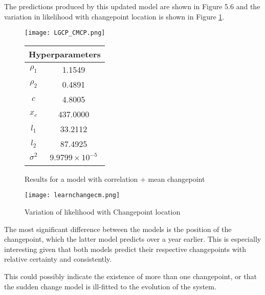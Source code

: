 \documentclass[a4paper,11pt]{report}
\begin{document}
The predictions produced by this updated model are shown in Figure 5.6 and the variation in likelihood with changepoint location is shown in Figure \ref{fig:cmcpvariation}. 
  \begin{figure}[!ht]
    \centering
    \texttt{[image: LGCP\_CMCP.png]}
    \qquad
    \doublespacing
    \begin{tabular}[b]{cc}
    \multicolumn{2}{c}{\textbf{Hyperparameters}}                                            \\ \hline
      \(\rho_1\)                    & 1.1549                \\                       
\(\rho_2\)                     & 0.4891                           \\            
\(c\)                               & 4.8005                                      \\ 
\(x_c\)                        & 437.0000                                         \\ 
\(l_1\)                               & 33.2112                                      \\  
\(l_2\) & 87.4925 \\ 
\(\sigma^2\) & \(9.9799 \times 10^{-5}\) \\ 
& \\
    \end{tabular}
    \captionsetup{labelformat=andtable}
    \caption{Results for a model with correlation + mean changepoint}
  \end{figure}
  
\begin{figure}
\centering
\texttt{[image: learnchangecm.png]}
\caption{Variation of likelihood with Changepoint location}
\label{fig:cmcpvariation}
\end{figure}

The most significant difference between the models is the position of the changepoint, which the latter model predicts over a year earlier. This is especially interesting given that both models predict their respective changepoints with relative certainty and consistently. \par

This could possibly indicate the existence of more than one changepoint, or that the sudden change model is ill-fitted to the evolution of the system. 

\end{document}
